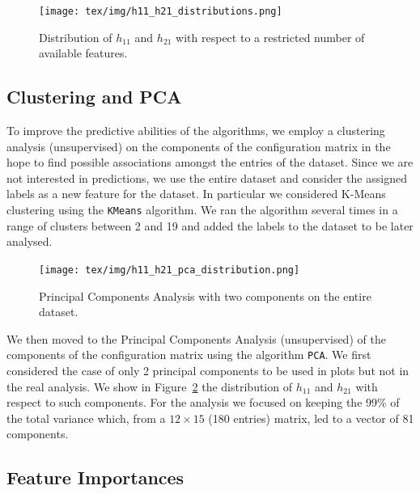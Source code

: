     \begin{figure}[p]
        \centering
        \texttt{[image: tex/img/h11\_h21\_distributions.png]}
        \caption{Distribution of $h_{11}$ and $h_{21}$ with respect to a restricted number of available features.}
        \label{fig:scatter_plot_distributions}
    \end{figure}
    
\subsection{Clustering and PCA}

    To improve the predictive abilities of the algorithms, we employ a clustering analysis (unsupervised) on the components of the configuration matrix in the hope to find possible associations amongst the entries of the dataset. Since we are not interested in predictions, we use the entire dataset and consider the assigned labels as a new feature for the dataset. In particular we considered K-Means clustering using the \texttt{KMeans} algorithm. We ran the algorithm several times in a range of clusters between 2 and 19 and added the labels to the dataset to be later analysed.
    
    \begin{figure}[!t]
        \centering
        \texttt{[image: tex/img/h11\_h21\_pca\_distribution.png]}
        \caption{Principal Components Analysis with two components on the entire dataset.}
        \label{fig:pca_analysis}
    \end{figure}
    
    We then moved to the Principal Components Analysis (unsupervised) of the components of the configuration matrix using the algorithm \texttt{PCA}. We first considered the case of only 2 principal components to be used in plots but not in the real analysis. We show in Figure~\ref{fig:pca_analysis} the distribution of $h_{11}$ and $h_{21}$ with respect to such components. For the analysis we focused on keeping the 99\% of the total variance which, from a $12 \times 15$ (180 entries) matrix, led to a vector of 81 components.
    
\subsection{Feature Importances}

